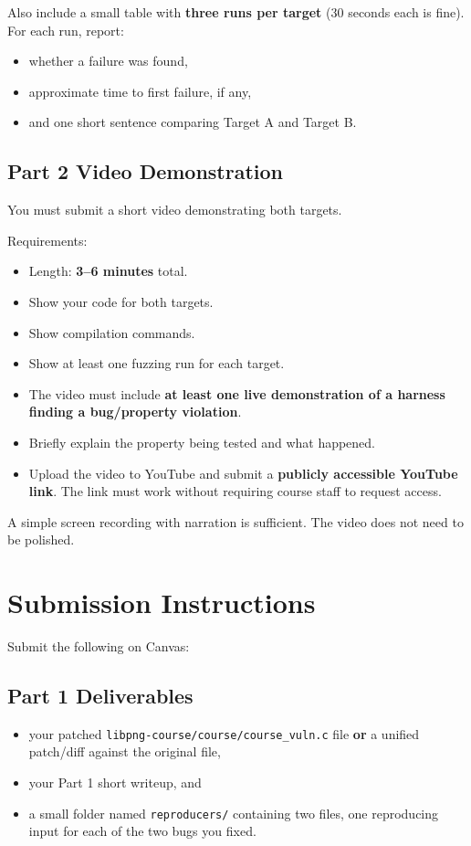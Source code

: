 \documentclass[11pt]{article}
\begin{document}
Also include a small table with \textbf{three runs per target} (30 seconds each is fine). For each run, report:
\begin{itemize}
    \item whether a failure was found,
    \item approximate time to first failure, if any,
    \item and one short sentence comparing Target A and Target B.
\end{itemize}

\subsection*{Part 2 Video Demonstration}
You must submit a short video demonstrating both targets.

Requirements:
\begin{itemize}
    \item Length: \textbf{3--6 minutes} total.
    \item Show your code for both targets.
    \item Show compilation commands.
    \item Show at least one fuzzing run for each target.
    \item The video must include \textbf{at least one live demonstration of a harness finding a bug/property violation}.
    \item Briefly explain the property being tested and what happened.
    \item Upload the video to YouTube and submit a \textbf{publicly accessible YouTube link}. The link must work without requiring course staff to request access.
\end{itemize}

A simple screen recording with narration is sufficient. The video does not need to be polished.

\section*{Submission Instructions}
Submit the following on Canvas:

\subsection*{Part 1 Deliverables}
\begin{itemize}
    \item your patched \texttt{libpng-course/course/course\_vuln.c} file \textbf{or} a unified patch/diff against the original file,
    \item your Part 1 short writeup, and
    \item a small folder named \texttt{reproducers/} containing two files, one reproducing input for each of the two bugs you fixed.
\end{itemize}
\end{document}
